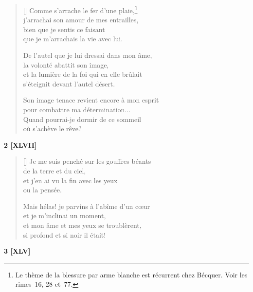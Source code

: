 \documentclass[a4paper,12pt]{book}
\begin{document}
\settowidth{\versewidth}{et la lumière de la foi qui en elle brûlait}

\begin{verse}[\versewidth]
  Comme s'arrache le fer d'une plaie,\footnote{Le thème de la blessure
  par arme blanche est récurrent chez Bécquer. Voir les rimes~16, 28
  et~77.} \\
  j'arrachai son amour de mes entrailles, \\
  bien que je sentis ce faisant \\
  que je m'arrachais la vie avec lui.

  De l'autel que je lui dressai dans mon âme, \\
  la volonté abattit son image, \\
  et la lumière de la foi qui en elle brûlait \\
  s'éteignit devant l'autel désert.

  Son image tenace revient encore à mon esprit \\
  pour combattre ma détermination... \\
  Quand pourrai-je dormir de ce sommeil \\
  où s'achève le rêve?
\end{verse}

\bigskip

\begin{center}
  \textbf{2 [XLVII]}
\end{center}

\settowidth{\versewidth}{Mais hélas! je parvins à l'abîme d'un cœur}

\begin{verse}[\versewidth]
  Je me suis penché sur les gouffres béants \\
  de la terre et du ciel, \\
  et j'en ai vu la fin avec les yeux \\
  ou la pensée.

  Mais hélas! je parvins à l'abîme d'un cœur \\
  et je m'inclinai un moment, \\
  et mon âme et mes yeux se troublèrent, \\
  si profond et si noir il était!
\end{verse}

\bigskip

\begin{center}
  \textbf{3 [XLV]}
\end{center}
\end{document}
